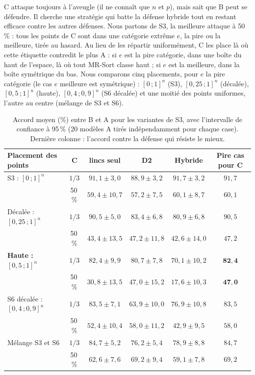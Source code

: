\documentclass[11pt,a4paper]{article}
\begin{document}
C attaque toujours à l'aveugle (il ne connaît que $n$ et $p$), mais sait que B peut se défendre. Il cherche une
stratégie qui batte la défense hybride tout en restant efficace contre les autres défenses. Nous partons de S3,
la meilleure attaque à 50\,\% : tous les points de C sont dans une catégorie extrême $e$, la pire ou la meilleure,
tirée au hasard. Au lieu de les répartir uniformément, C les place là où cette étiquette contredit le plus A : si
$e$ est la pire catégorie, dans une boîte du haut de l'espace, là où tout MR-Sort classe haut ; si $e$ est la
meilleure, dans la boîte symétrique du bas. Nous comparons cinq placements, pour $e$ la pire catégorie (le cas
$e$ meilleure est symétrique) : $[0\,;1]^n$ (S3), $[0{,}25\,;1]^n$ (décalée), $[0{,}5\,;1]^n$ (haute),
$[0{,}4\,;0{,}9]^n$ (S6 décalée) et une moitié des points uniformes, l'autre au centre (mélange de S3 et S6).

\begin{table}[h]
\centering
\small
\begin{tabularx}{\textwidth}{>{\raggedright\arraybackslash}p{4.2cm}cCCCc}
\toprule
Placement des points & C & lincs seul & D2 & Hybride & Pire cas pour C \\
\midrule
S3 : $[0\,;1]^n$                 & $1/3$  & $91{,}1 \pm 3{,}0$  & $88{,}9 \pm 3{,}2$  & $91{,}7 \pm 3{,}2$  & $91{,}7$ \\
                                 & 50\,\% & $59{,}4 \pm 10{,}7$ & $57{,}2 \pm 7{,}5$  & $60{,}1 \pm 8{,}7$  & $60{,}1$ \\
Décalée : $[0{,}25\,;1]^n$       & $1/3$  & $90{,}5 \pm 5{,}0$  & $83{,}4 \pm 6{,}8$  & $80{,}9 \pm 6{,}8$  & $90{,}5$ \\
                                 & 50\,\% & $43{,}4 \pm 13{,}5$ & $47{,}2 \pm 11{,}8$ & $42{,}6 \pm 14{,}0$ & $47{,}2$ \\
\textbf{Haute : $[0{,}5\,;1]^n$} & $1/3$  & $82{,}4 \pm 9{,}9$  & $80{,}7 \pm 7{,}8$  & $70{,}1 \pm 10{,}2$ & $\mathbf{82{,}4}$ \\
                                 & 50\,\% & $30{,}8 \pm 13{,}5$ & $47{,}0 \pm 15{,}2$ & $17{,}6 \pm 10{,}3$ & $\mathbf{47{,}0}$ \\
S6 décalée : $[0{,}4\,;0{,}9]^n$ & $1/3$  & $83{,}5 \pm 7{,}1$  & $63{,}9 \pm 10{,}0$ & $76{,}9 \pm 10{,}8$ & $83{,}5$ \\
                                 & 50\,\% & $52{,}4 \pm 10{,}4$ & $58{,}0 \pm 11{,}2$ & $42{,}9 \pm 9{,}5$  & $58{,}0$ \\
Mélange S3 et S6                 & $1/3$  & $84{,}7 \pm 5{,}2$  & $76{,}2 \pm 5{,}4$  & $78{,}9 \pm 8{,}8$  & $84{,}7$ \\
                                 & 50\,\% & $62{,}6 \pm 7{,}6$  & $69{,}2 \pm 9{,}4$  & $59{,}1 \pm 7{,}8$  & $69{,}2$ \\
\bottomrule
\end{tabularx}
\caption{Accord moyen (\%) entre B et A pour les variantes de S3, avec l'intervalle de confiance à 95\,\% (20
modèles A tirés indépendamment pour chaque case). Dernière colonne : l'accord contre la défense qui résiste le
mieux.}
\label{tab:counter}
\end{table}
\end{document}
